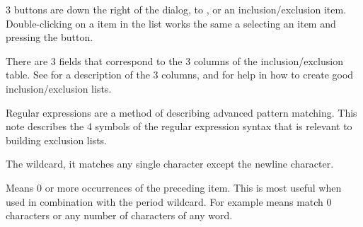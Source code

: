 3 buttons are down the right of the dialog, to ,
 or  an inclusion/exclusion item.
Double-clicking on a item in the list works the same a selecting an item and
pressing the  button.


There are 3 fields that correspond to the 3 columns of the inclusion/exclusion table. See
\helpignore{\ref{sec:pd-exclusion-dialog}}  for a description of the 3 columns, and
\helpignore{\ref{sec:pd-exclusion-dialog-regular-expressions}}
 for help in how to
create good inclusion/exclusion lists.


Regular expressions are a method of describing advanced pattern matching. This
note describes the 4 symbols of the regular expression syntax that is relevant
to building \brandingapplicationsuitename exclusion lists.

 The wildcard, it matches any single
character except the newline character.

\regexcommand{*} Means 0 or more occurrences of the preceding item. This is
most useful when used in combination with the period wildcard. For example
 means match 0 characters or any number of characters of any
word.

